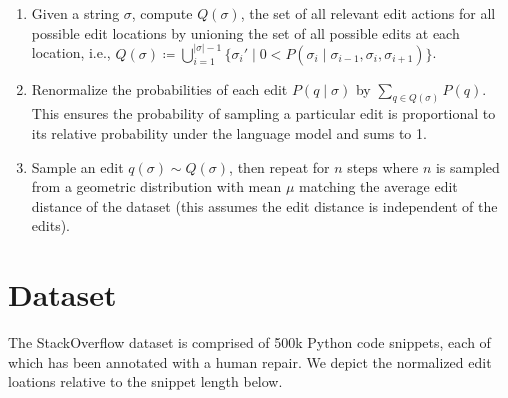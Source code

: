 \documentclass[sigplan,review,anonymous,acmsmall]{acmart}\settopmatter{printfolios=false,printccs=false,printacmref=false}
\begin{document}
  \begin{enumerate}
    \item Given a string $\sigma$, compute $Q(\sigma)$, the set of all relevant edit actions for all possible edit locations by unioning the set of all possible edits at each location, i.e., $Q(\sigma) \coloneqq \bigcup_{i=1}^{|\sigma| - 1} \big\{\sigma_i' \mid  0 < P(\sigma_i \mid \sigma_{i-1}, \sigma_i, \sigma_{i+1})\big\}$.
    \item Renormalize the probabilities of each edit $P(q \mid \sigma)$ by $\sum_{q \in Q(\sigma)} P(q)$. This ensures the probability of sampling a particular edit is proportional to its relative probability under the language model and sums to 1.
    \item Sample an edit $q(\sigma) \sim Q(\sigma)$, then repeat for $n$ steps where $n$ is sampled from a geometric distribution with mean $\mu$ matching the average edit distance of the dataset (this assumes the edit distance is independent of the edits).
  \end{enumerate}

  \section{Dataset}

  The StackOverflow dataset is comprised of 500k Python code snippets, each of which has been annotated with a human repair. We depict the normalized edit loations relative to the snippet length below.

  \begin{figure}
  \end{figure}
\end{document}
